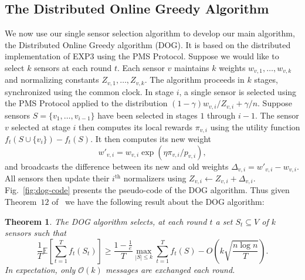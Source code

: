 \documentclass{sig-alternate-dan}
\numberwithin{equation}{section}
\newcommand{\algofont}[1]{\textsc{#1}}
\newcommand{\algoname}{{\algofont{DOG}}\xspace}
\newcommand{\cO}{\mathcal{O}}
\newcommand{\EXPthree}{{\algofont{EXP3}}\xspace}
\newcommand{\sensor}{\ensuremath{v}}
\newcommand{\sensors}{V}
\newcommand{\obj}{\ensuremath{f}} %
\newcommand{\payoff}{\ensuremath{\pi}}
\newcommand{\LimitProtocolShort}[0]{PMS Protocol\xspace}
\newcommand{\ith}{\ensuremath{i^{\mathrm{th}}}\xspace}
\newcommand{\vfigref}[1]{Fig.~\vref{#1}}
\newtheorem{theorem}{Theorem}
\begin{document}
\subsection{The Distributed Online Greedy Algorithm}
We now use our single sensor selection algorithm to develop our main
algorithm, the Distributed Online Greedy algorithm (\algoname).  It is
based on the distributed implementation of \EXPthree using the
\LimitProtocolShort. 
Suppose we would like to select $k$ sensors at each round
$t$.  Each sensor $\sensor$ maintains $k$ weights
$w_{\sensor,1},\dots,w_{\sensor,k}$ and normalizing constants
$Z_{\sensor,1},\dots,Z_{\sensor,k}$. The algorithm proceeds in $k$
stages, synchronized using the common clock. In stage $i$, a single
sensor is selected using the \LimitProtocolShort applied to the
distribution $(1-\gamma)w_{\sensor,i}/Z_{\sensor,i} + \gamma/n$.
Suppose sensors $S=\{\sensor_{1},\dots,\sensor_{i-1}\}$ have been
selected in stages $1$ through $i-1$.  The sensor $\sensor$ selected
at stage $i$ then computes its local rewards $\payoff_{\sensor,i}$
using the utility function
$\obj_{t}(S\cup\{\sensor_{i}\})-\obj_{t}(S)$. It then computes its new
weight
$$w'_{\sensor,i}=w_{\sensor,i}\exp(\eta \payoff_{\sensor,i} /
p_{\sensor,i}),$$ and broadcasts the difference between its new and
old weights $\Delta_{\sensor,i}=w'_{\sensor,i}-w_{\sensor,i}$.  All
sensors then update their $\ith$ normalizers using
$Z_{\sensor,i}\leftarrow Z_{\sensor,i}+\Delta_{\sensor,i}$.
\vfigref{fig:dog-code} presents the pseudo-code of the \algoname
algorithm.  Thus given Theorem~$12$ of~\cite{streeter07tr} we have the
following result about the \algoname algorithm:
%
%
\begin{theorem}\label{thm:dog-performance}
The \algoname algorithm selects, at each round $t$ a set
$S_{t}\subseteq\sensors$ of $k$ sensors such that
\[
\frac{1}{T}\mathbb{E}\left[\sum_{t=1}^{T}f_{t}(S_{t})\right]\geq
\frac{1-\frac{1}{e}}{T}\max_{|S|\leq k} \sum_{t=1}^{T} f_{t}(S) -
O\left(k\sqrt{\frac{n\log n}{T}}\right).
\]
In expectation, only $\cO(k)$ messages are exchanged each round. 
%
%
%
\end{theorem}


%
%
%
%
%
\end{document}

